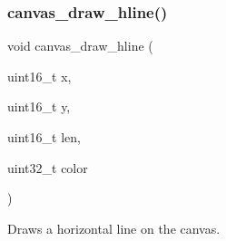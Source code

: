 \subsubsection{\texorpdfstring{canvas\+\_\+draw\+\_\+hline()}{canvas\_draw\_hline()}}
{\footnotesize\ttfamily void canvas\+\_\+draw\+\_\+hline (\begin{DoxyParamCaption}\item[{uint16\+\_\+t}]{x,  }\item[{uint16\+\_\+t}]{y,  }\item[{uint16\+\_\+t}]{len,  }\item[{uint32\+\_\+t}]{color }\end{DoxyParamCaption})}



Draws a horizontal line on the canvas. 



